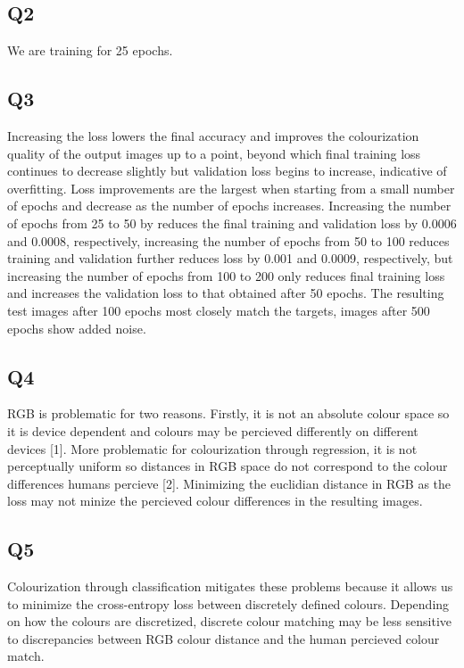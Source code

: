 \documentclass[12pt,letterpaper]{article} %
\begin{document}
\subsection{Q2}
We are training for 25 epochs.

\subsection{Q3}
Increasing the loss lowers the final accuracy and improves the colourization quality of the output images up to a point, beyond which final training loss continues to decrease slightly but validation loss begins to increase, indicative of overfitting. Loss improvements are the largest when starting from a small number of epochs and decrease as the number of epochs increases. Increasing the number of epochs  from 25 to 50 by reduces the final training and validation loss by 0.0006 and 0.0008, respectively, increasing the number of epochs from 50 to 100 reduces training and validation further reduces loss by 0.001 and 0.0009, respectively, but increasing the number of epochs from 100 to 200 only reduces final training loss and increases the validation loss to that obtained after 50 epochs. The resulting test images after 100 epochs most closely match the targets, images after 500 epochs show added noise.

\subsection{Q4}

RGB is problematic for two reasons. Firstly, it is not an absolute colour space so it is device dependent and colours may be percieved differently on different devices [1]. More problematic for colourization through regression, it is not perceptually uniform so distances in RGB space do not correspond to the colour differences humans percieve [2]. Minimizing the euclidian distance in RGB as the loss may not minize the percieved colour differences in the resulting images. 

\subsection{Q5}
Colourization through classification mitigates these problems because it allows us to minimize the cross-entropy loss between discretely defined colours. Depending on how the colours are discretized, discrete colour matching may be less sensitive to discrepancies between RGB colour distance and the human percieved colour match. 
\end{document}
